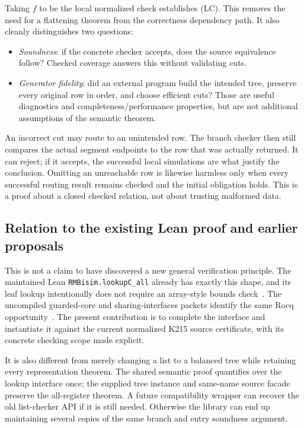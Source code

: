 \documentclass[11pt]{article}
\theoremstyle{remark}\newtheorem{remark}[theorem]{Remark}
\newcommand{\code}[1]{\texttt{\small #1}}
\begin{document}
Taking $f$ to be the local normalized check establishes (LC). This removes the need for a flattening theorem from the correctness dependency path. It also cleanly distinguishes two questions:
\begin{itemize}
\item \emph{Soundness}: if the concrete checker accepts, does the source equivalence follow? Checked coverage answers this without validating cuts.
\item \emph{Generator fidelity}: did an external program build the intended tree, preserve every original row in order, and choose efficient cuts? Those are useful diagnostics and completeness/performance properties, but are not additional assumptions of the semantic theorem.
\end{itemize}

An incorrect cut may route to an unintended row. The branch checker then still compares the actual segment endpoints to the row that was actually returned. It can reject; if it accepts, the successful local simulations are what justify the conclusion. Omitting an unreachable row is likewise harmless only when every successful routing result remains checked and the initial obligation holds. This is a proof about a closed checked relation, not about trusting malformed data.

\subsection{Relation to the existing Lean proof and earlier proposals}
This is not a claim to have discovered a new general verification principle. The maintained Lean \code{RMBisim.lookupC\_all} already has exactly this shape, and its leaf lookup intentionally does not require an array-style bounds check~\cite{leanchecker}. The uncompiled guarded-core and sharing-interfaces packets identify the same Rocq opportunity~\cite{lookupdesign}. The present contribution is to complete the interface and instantiate it against the current normalized K215 source certificate, with its concrete checking scope made explicit.

It is also different from merely changing a list to a balanced tree while retaining every representation theorem. The shared semantic proof quantifies over the lookup interface once; the supplied tree instance and same-name source facade preserve the all-register theorem. A future compatibility wrapper can recover the old list-checker API if it is still needed. Otherwise the library can end up maintaining several copies of the same branch and entry soundness argument.
\end{document}
